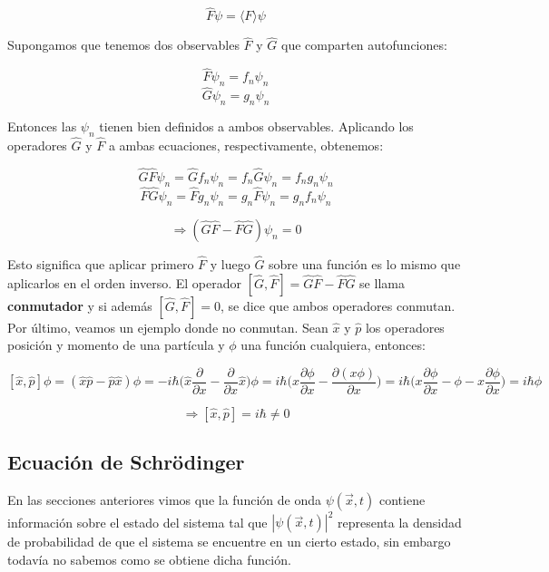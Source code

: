 \documentclass[a4paper]{article}
\begin{document}
\begin{equation}
\label{eq:autofunciones}
\hat{F}\psi = \langle F \rangle \psi
\end{equation}

Supongamos que tenemos dos observables $\hat{F}$ y $\hat{G}$ que comparten autofunciones:

$$\hat{F}\psi_{n} = f_{n}\psi_{n}$$
$$\hat{G}\psi_{n} = g_{n}\psi_{n}$$

Entonces las $\psi_{n}$ tienen bien definidos a ambos observables. Aplicando los operadores $\hat{G}$ y $\hat{F}$ a ambas ecuaciones, respectivamente, obtenemos:

$$\hat{G}\hat{F}\psi_{n} = \hat{G}f_{n}\psi_{n} = f_{n}\hat{G}\psi_{n} = f_{n}g_{n}\psi_{n}$$
$$\hat{F}\hat{G}\psi_{n} = \hat{F}g_{n}\psi_{n} = g_{n}\hat{F}\psi_{n} = g_{n}f_{n}\psi_{n}$$

$$ \Rightarrow (\hat{G}\hat{F} - \hat{F}\hat{G})\psi_{n} = 0$$

Esto significa que aplicar primero $\hat{F}$ y luego $\hat{G}$ sobre una funci\'on es lo mismo que aplicarlos en el orden inverso. El operador $[\hat{G}, \hat{F}] = \hat{G}\hat{F} - \hat{F}\hat{G}$ se llama \textbf{conmutador} y si adem\'as $[\hat{G}, \hat{F}] = 0$, se dice que ambos operadores conmutan.\\

Por \'ultimo, veamos un ejemplo donde no conmutan. Sean $\hat{x}$ y $\hat{p}$ los operadores posici\'on y momento de una part\'icula y $\phi$ una funci\'on cualquiera, entonces:

$$[\hat{x}, \hat{p}]\phi = (\hat{x}\hat{p} - \hat{p}\hat{x})\phi = -i\hbar \bigg( \hat{x}\frac{\partial}{\partial x} - \frac{\partial}{\partial x} \hat{x}\bigg)\phi = i\hbar \bigg( x\frac{\partial \phi}{\partial x} - \frac{\partial(x\phi)}{\partial x}\bigg) = i\hbar \bigg( x\frac{\partial \phi}{\partial x} - \phi - x\frac{\partial\phi}{\partial x}\bigg) = i\hbar \phi$$

$$ \Rightarrow [\hat{x}, \hat{p}] = i\hbar \neq 0$$

\subsection{Ecuaci\'on de Schr\"odinger}

En las secciones anteriores vimos que la funci\'on de onda $\psi(\vec{x},t)$ contiene informaci\'on sobre el estado del sistema tal que $|\psi(\vec{x},t)|^{2}$ representa la densidad de probabilidad de que el sistema se encuentre en un cierto estado, sin embargo todav\'ia no sabemos como se obtiene dicha funci\'on.\\
\end{document}

